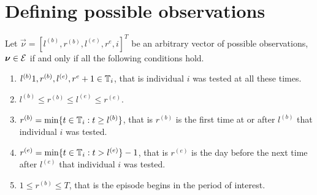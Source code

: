 \documentclass[thesis.tex]{subfiles}
\begin{document}
\chapter{Defining possible observations} \label{perf-test:sec:conditions-nu-E}

Let $\vec{\nu} = [l^{(b)}, r^{(b)}, l^{(e)}, r^{e}, i]^T$ be an arbitrary vector of possible observations, $\bm{\nu} \in \mathcal{E}$ if and only if all the following conditions hold.
\begin{enumerate}
  \item $l^{(b)} 1, r^{(b)}, l^{(e)}, r^{e} + 1 \in \mathbb{T}_{i}$, that is individual ${i}$ was tested at all these times.
  \item $l^{(b)} \leq r^{(b)} \leq l^{(e)} \leq r^{(e)}$.
  \item $r^{(b)} = \min\{t \in \mathbb{T}_{i} : t \geq l^{(b)}\}$, that is $r^{(b)}$ is the first time at or after $l^{(b)}$ that individual ${i}$ was tested.
  \item $r^{(e)} = \min\{t \in \mathbb{T}_{i} : t > l^{(e)}\} - 1$, that is $r^{(e)}$ is the day before the next time after $l^{(e)}$ that individual ${i}$ was tested.
  \item $1 \leq r^{(b)} \leq T$, that is the episode begins in the period of interest.
\end{enumerate}
\end{document}
